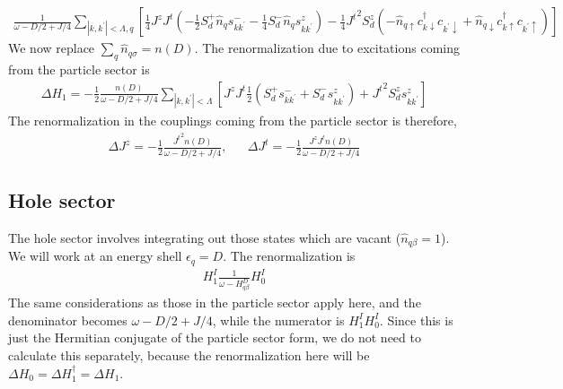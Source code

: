 \documentclass{revtex4-2}
\numberwithin{equation}{section}
\begin{document}
\begin{equation}\begin{aligned}
	\frac{1}{\omega - D/2 + J/4}\sum_{|k,k^\prime|<\Lambda,q}\left[\frac{1}{4}J^z J^t \left(-\frac{1}{2}S_d^+ \hat n_{q}s^-_{kk^\prime} - \frac{1}{4}S_d^- \hat n_{q} s^z_{kk^\prime}\right) - \frac{1}{4}{J^t}^2 S_d^z\left(-\hat n_{q \uparrow}c^\dagger_{k \downarrow}c_{k^\prime \downarrow} + \hat n_{q \downarrow}c^\dagger_{k \uparrow}c_{k^\prime \uparrow}\right)\right]
\end{aligned}\end{equation}
We now replace \(\sum_q \hat n_{q\sigma} = n(D)\). The renormalization due to excitations coming from the particle sector is
\begin{equation}\begin{aligned}
	\Delta H_1 = -\frac{1}{2}\frac{n(D)}{\omega - D/2 + J/4}\sum_{|k,k^\prime|<\Lambda}\left[J^z J^t \frac{1}{2}\left(S_d^+ s^-_{kk^\prime} + S_d^- s^z_{kk^\prime}\right) + {J^t}^2 S_d^z s^z_{kk^\prime}\right]
\end{aligned}\end{equation}
The renormalization in the couplings coming from the particle sector is therefore,
\begin{equation}\begin{aligned}
	\label{kondo_part}
	\Delta J^z = -\frac{1}{2}\frac{{J^t}^2n(D)}{\omega - D/2 + J/4}, && \Delta J^t = -\frac{1}{2}\frac{J^z J^tn(D)}{\omega - D/2 + J/4}
\end{aligned}\end{equation}


\subsection{Hole sector}
The hole sector involves integrating out those states which are vacant (\(\hat n_{q\beta}=1\)). We will work at an energy  shell \(\epsilon_q = D\). The renormalization is
\begin{equation}\begin{aligned}
	H^I_1 \frac{1}{\omega - H^D_{q\beta}} H^I_0
\end{aligned}\end{equation}
The same considerations as those in the particle sector apply here, and the denominator becomes \(\omega - D/2 + J/4\), while the numerator is \(H^I_1 H^I_0\). Since this is just the Hermitian conjugate of the particle sector form, we do not need to calculate this separately, because the renormalization here will be \(\Delta H_0 = \Delta H_1^\dagger = \Delta H_1\).
\end{document}
